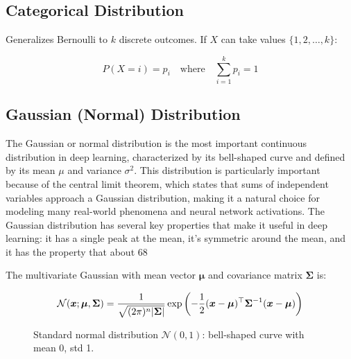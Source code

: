 \subsection{Categorical Distribution}

Generalizes Bernoulli to $k$ discrete outcomes. If $X$ can take values $\{1, 2, \ldots, k\}$:

\begin{equation}
P(X=i) = p_i \quad \text{where} \quad \sum_{i=1}^{k} p_i = 1
\end{equation}

\subsection{Gaussian (Normal) Distribution}

The Gaussian or normal distribution is the most important continuous distribution in deep learning, characterized by its bell-shaped curve and defined by its mean $\mu$ and variance $\sigma^2$. This distribution is particularly important because of the central limit theorem, which states that sums of independent variables approach a Gaussian distribution, making it a natural choice for modeling many real-world phenomena and neural network activations. The Gaussian distribution has several key properties that make it useful in deep learning: it has a single peak at the mean, it's symmetric around the mean, and it has the property that about 68%

The multivariate Gaussian with mean vector $\boldsymbol{\mu}$ and covariance matrix $\boldsymbol{\Sigma}$ is:

\begin{equation}
\mathcal{N}(\boldsymbol{x}; \boldsymbol{\mu}, \boldsymbol{\Sigma}) = \frac{1}{\sqrt{(2\pi)^n |\boldsymbol{\Sigma}|}} \exp\left(-\frac{1}{2}(\boldsymbol{x}-\boldsymbol{\mu})^\top \boldsymbol{\Sigma}^{-1} (\boldsymbol{x}-\boldsymbol{\mu})\right)
\end{equation}

\begin{figure}[h]
\centering
{}
\caption{Standard normal distribution $\mathcal{N}(0,1)$: bell-shaped curve with mean 0, std 1.}
\label{fig:gaussian-distribution}
\end{figure}

